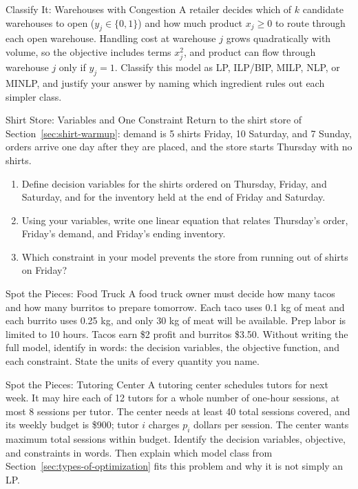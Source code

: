 \begin{ex}{Classify It: Warehouses with Congestion}{}
 A retailer decides which of $k$ candidate warehouses to open ($y_j \in \{0,1\}$) and how much product $x_j \geq 0$ to route through each open warehouse.  Handling cost at warehouse $j$ grows quadratically with volume, so the objective includes terms $x_j^2$, and product can flow through warehouse $j$ only if $y_j = 1$.  Classify this model as LP, ILP/BIP, MILP, NLP, or MINLP, and justify your answer by naming which ingredient rules out each simpler class.
\end{ex}


\begin{ex}{Shirt Store: Variables and One Constraint}{}
\label{ex:shirt-friday-balance}
 Return to the shirt store of Section~\ref{sec:shirt-warmup}: demand is 5 shirts Friday, 10 Saturday, and 7 Sunday, orders arrive one day after they are placed, and the store starts Thursday with no shirts.
\begin{enumerate}
\item Define decision variables for the shirts ordered on Thursday, Friday, and Saturday, and for the inventory held at the end of Friday and Saturday.
\item Using your variables, write one linear equation that relates Thursday's order, Friday's demand, and Friday's ending inventory.
\item Which constraint in your model prevents the store from running out of shirts on Friday?
\end{enumerate}
\end{ex}

\begin{ex}{Spot the Pieces: Food Truck}{}
 A food truck owner must decide how many tacos and how many burritos to prepare tomorrow.  Each taco uses 0.1 kg of meat and each burrito uses 0.25 kg, and only 30 kg of meat will be available.  Prep labor is limited to 10 hours.  Tacos earn \$2 profit and burritos \$3.50.  Without writing the full model, identify in words: the decision variables, the objective function, and each constraint.  State the units of every quantity you name.
\end{ex}

\begin{ex}{Spot the Pieces: Tutoring Center}{}
 A tutoring center schedules tutors for next week.  It may hire each of 12 tutors for a whole number of one-hour sessions, at most 8 sessions per tutor.  The center needs at least 40 total sessions covered, and its weekly budget is \$900; tutor $i$ charges $p_i$ dollars per session.  The center wants maximum total sessions within budget.  Identify the decision variables, objective, and constraints in words.  Then explain which model class from Section~\ref{sec:types-of-optimization} fits this problem and why it is not simply an LP.
\exrefs{\S\ref{sec:what-is-MP}, \S\ref{sec:types-of-optimization}}
\end{ex}


